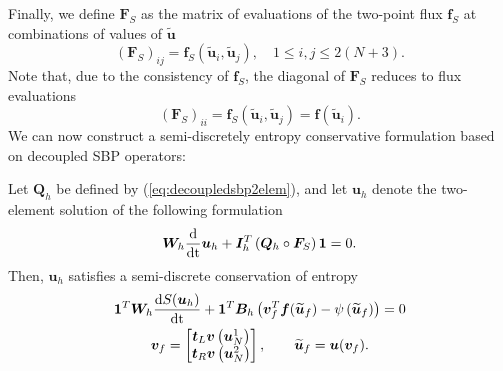 \documentclass[review,onefignum,onetabnum,final]{siamart171218}
\renewcommand{\tilde}{\widetilde}
\newcommand{\td}[2]{\frac{{\rm d}#1}{{\rm d}{\rm #2}}}
\newcommand{\LRp}[1]{\left( #1 \right)}
\begin{document}
Finally, we define $\bm{F}_S$ as the matrix of evaluations of the two-point flux $\bm{f}_S$ at combinations of values of $\tilde{\bm{u}}$
\[
\LRp{\bm{F}_S}_{ij} = \bm{f}_S\LRp{\tilde{\bm{u}}_i,\tilde{\bm{u}}_j}, \quad 1\leq i,j \leq 2(N+3).
\]
Note that, due to the consistency of $\bm{f}_S$, the diagonal of $\bm{F}_S$ reduces to flux evaluations
\begin{equation}
\label{eq:diagFS}
\LRp{\bm{F}_S}_{ii} = \bm{f}_S\LRp{\tilde{\bm{u}}_i,\tilde{\bm{u}}_j} = \bm{f}\LRp{\tilde{\bm{u}}_i}.  
\end{equation}
We can now construct a semi-discretely entropy conservative formulation based on decoupled SBP operators:
\begin{theorem}
\label{thm:consentropy}
Let $\bm{Q}_h$ be defined by (\ref{eq:decoupledsbp2elem}), and let $\bm{u}_h$ denote the two-element solution of the following formulation
\begin{gather}
\label{eq:form}
\bm{W}_h \td{}{t} \bm{u}_h + \bm{I}_h^T\LRp{\bm{Q}_h \circ \bm{F}_S}\bm{1} = 0.
\end{gather}
Then, $\bm{u}_h$ satisfies a semi-discrete conservation of entropy
\begin{gather*}
\bm{1}^T\bm{W}_h\td{S(\bm{u}_h)}{t} + \bm{1}^T\bm{B}_h\LRp{\bm{v}_f^T\bm{f}(\tilde{\bm{u}}_f) - \psi\LRp{\tilde{\bm{u}}_f}} = 0\\
\bm{v}_f = \begin{bmatrix}
\bm{t}_L \bm{v}\LRp{\bm{u}_N^1}\\
\bm{t}_R \bm{v}\LRp{\bm{u}_N^2}
\end{bmatrix}, \qquad \tilde{\bm{u}}_f = \bm{u}(\bm{v}_f).
\end{gather*}
\end{theorem}
\end{document}
